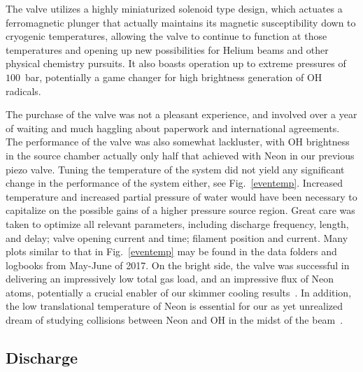The valve utilizes a highly miniaturized solenoid type design, which actuates a ferromagnetic plunger that actually maintains its magnetic susceptibility down to cryogenic temperatures, allowing the valve to continue to function at those temperatures and opening up new possibilities for Helium beams and other physical chemistry pursuits.
It also boasts operation up to extreme pressures of $100$~bar, potentially a game changer for high brightness generation of OH radicals.

The purchase of the valve was not a pleasant experience, and involved over a year of waiting and much haggling about paperwork and international agreements.
The performance of the valve was also somewhat lackluster, with OH brightness in the source chamber actually only half that achieved with Neon in our previous piezo valve.
Tuning the temperature of the system did not yield any significant change in the performance of the system either, see Fig.~\ref{eventemp}.
Increased temperature and increased partial pressure of water would have been necessary to capitalize on the possible gains of a higher pressure source region.
Great care was taken to optimize all relevant parameters, including discharge frequency, length, and delay; valve opening current and time; filament position and current.
Many plots similar to that in Fig.~\ref{eventemp} may be found in the data folders and logbooks from May-June of 2017.
On the bright side, the valve was successful in delivering an impressively low total gas load, and an impressive flux of Neon atoms, potentially a crucial enabler of our skimmer cooling results~\cite{Wu2018}.
In addition, the low translational temperature of Neon is essential for our as yet unrealized dream of studying collisions between Neon and OH in the midst of the beam~\citep[Chapter~7]{WuThesis2019}.

\subsection{Discharge}\label{secdisch}

